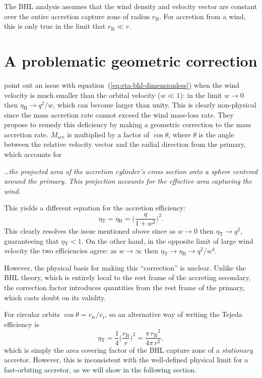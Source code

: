 \documentclass[useAMS, usenatbib, a4paper]{mnras}
\newcommand\wind{\ensuremath{_{\mathrm{w}}}}
\newcommand\rel{\ensuremath{_{\mathrm{r}}}}
\newcommand\bhl{\ensuremath{_{\mathrm{\scriptscriptstyle B}}}}
\newcommand\Tej{\ensuremath{_{\mathrm{\scriptscriptstyle T}}}}
\newcommand\acc{\ensuremath{_{\mathrm{acc}}}}
\newcommand\mdacc{\ensuremath{\dot M\acc}}
\begin{document}
The BHL analysis assumes that the wind density and velocity vector are constant
over the entire accretion capture zone of radius \(r\bhl\).
For accretion from a wind, this is only true in the limit that
\(r\bhl \ll r\). 

\section{A problematic geometric correction}
\label{sec:Tejeda-geometry}

\cite{Tejeda:2025a} point out an issue with equation~(\ref{eq:eta-bhl-dimensionless}) when the wind velocity is much smaller than the orbital velocity (\(w \ll 1\)): in the limit \(w \to 0\) then \(\eta\bhl \to q^2 / w\), which can become larger than unity.
This is clearly non-physical since the mass accretion rate cannot exceed the wind mass-loss rate.
They propose to remedy this deficiency by making a geometric correction
to the mass accretion rate.
\(\mdacc\) is multiplied by a factor of \(\cos\theta\),
where \(\theta\) is the angle between the relative velocity vector
and the radial direction from the primary,
which accounts for
\begin{center}
  \begin{minipage}{0.8\linewidth}\small\itshape
    \dots the projected area of the accretion cylinder's
    cross section onto a sphere centered around the primary. This
    projection accounts for the effective area capturing the wind.
  \end{minipage}
\end{center}
This yields a different equation for the accretion efficiency:
\begin{equation}
  \label{eq:eta-tejeda-dimensionless}
  \eta\Tej = \eta\bhl = \biggl( \frac{q}{1 + w^2} \biggr)^2 .
\end{equation}
This clearly resolves the issue mentioned above since as
\(w \to 0\) then \(\eta\Tej \to q^2 \), guaranteeing that \(\eta\Tej < 1  \).
On the other hand, in the opposite limit of large wind velocity
the two efficiencies agree: as \(w \to \infty\) then \(\eta\Tej \to \eta\bhl \to q^2 / w^4\).

However, the physical basis for making this ``correction'' is unclear.
Unlike the BHL theory, which is entirely local
to the rest frame of the accreting secondary,
the correction factor introduces quantities from the rest frame of the primary,
which casts doubt on its validity.

For circular orbits \(\cos\theta = v\wind / v\rel\), so an alternative
way of writing the Tejeda efficiency is
\begin{equation}
  \label{eq:eta-tejeda}
  \eta\Tej = \frac{1}{4}
  \biggl( \frac{r\bhl}{r}\biggr)^2
  =  \frac{\pi \, r\bhl^2}{4 \pi \, r^2} ,
\end{equation}
which is simply the area covering factor of the BHL capture zone
of a \emph{stationary} accretor.
However, this is inconsistent with the well-defined physical limit
for a fast-orbiting accretor, as we will show in the following section.
\end{document}
